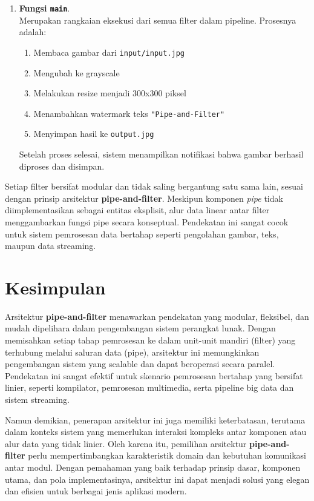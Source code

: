 \begin{enumerate}
	\item \textbf{Fungsi \texttt{main}}.\\
	Merupakan rangkaian eksekusi dari semua filter dalam pipeline. Prosesnya adalah:
	\begin{enumerate}
		\item Membaca gambar dari \texttt{input/input.jpg}
		\item Mengubah ke grayscale
		\item Melakukan resize menjadi 300x300 piksel
		\item Menambahkan watermark teks \texttt{"Pipe-and-Filter"}
		\item Menyimpan hasil ke \texttt{output.jpg}
	\end{enumerate}
	Setelah proses selesai, sistem menampilkan notifikasi bahwa gambar berhasil diproses dan disimpan.

\end{enumerate}
	Setiap filter bersifat modular dan tidak saling bergantung satu sama lain, sesuai dengan prinsip arsitektur \textbf{pipe-and-filter}. Meskipun komponen \textit{pipe} tidak diimplementasikan sebagai entitas eksplisit, alur data linear antar filter menggambarkan fungsi pipe secara konseptual. Pendekatan ini sangat cocok untuk sistem pemrosesan data bertahap seperti pengolahan gambar, teks, maupun data streaming.
	
\section{Kesimpulan}

Arsitektur \textbf{pipe-and-filter} menawarkan pendekatan yang modular, fleksibel, dan mudah dipelihara dalam pengembangan sistem perangkat lunak. Dengan memisahkan setiap tahap pemrosesan ke dalam unit-unit mandiri (filter) yang terhubung melalui saluran data (pipe), arsitektur ini memungkinkan pengembangan sistem yang scalable dan dapat beroperasi secara paralel. Pendekatan ini sangat efektif untuk skenario pemrosesan bertahap yang bersifat linier, seperti kompilator, pemrosesan multimedia, serta pipeline big data dan sistem streaming.

Namun demikian, penerapan arsitektur ini juga memiliki keterbatasan, terutama dalam konteks sistem yang memerlukan interaksi kompleks antar komponen atau alur data yang tidak linier. Oleh karena itu, pemilihan arsitektur \textbf{pipe-and-filter} perlu mempertimbangkan karakteristik domain dan kebutuhan komunikasi antar modul. Dengan pemahaman yang baik terhadap prinsip dasar, komponen utama, dan pola implementasinya, arsitektur ini dapat menjadi solusi yang elegan dan efisien untuk berbagai jenis aplikasi modern.


